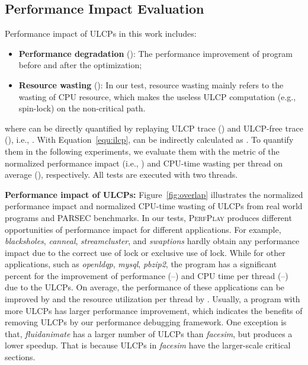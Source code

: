 \subsection{Performance Impact Evaluation}
\label{sec:perf}
Performance impact of ULCPs in this work includes:
\begin{itemize}
  \item \textbf{Performance degradation} (): The performance improvement of program before and after the optimization;
  \item \textbf{Resource wasting} (): In our test, resource wasting mainly refers to the wasting of CPU resource, which makes the useless ULCP computation (e.g., spin-lock) on the non-critical path.
\end{itemize}
\noindent where  can be directly quantified by replaying ULCP trace () and ULCP-free trace (), i.e., . With Equation~\ref{equ:ilcp},  can be indirectly calculated as . To quantify them in the following experiments, we evaluate them with the metric of the normalized performance impact (i.e., ) and CPU-time wasting per thread on average (), respectively.
All tests are executed with two threads. 

\textbf{Performance impact of ULCPs:} Figure~\ref{fig:overlap} illustrates the normalized performance impact and normalized CPU-time wasting of ULCPs from  real world programs and PARSEC benchmarks. In our tests, \textsc{PerfPlay} produces different opportunities of performance impact for different applications. For example, \emph{blacksholes}, \emph{canneal}, \emph{streamcluster}, and \emph{swaptions} hardly obtain any performance impact due to the correct use of lock or exclusive use of lock. While for other applications, such as \emph{openldqp}, \emph{mysql}, \emph{pbzip2}, the program has a significant percent for the improvement of performance (--) and CPU time per thread (--) due to the ULCPs. On average, the performance of these applications can be improved by  and the resource utilization per thread by . Usually, a program with more ULCPs has larger performance improvement, which indicates the benefits of removing ULCPs by our performance debugging framework. One exception is that, \emph{fluidanimate} has a larger number of ULCPs than \emph{facesim}, but produces a lower speedup. That is because ULCPs in \emph{facesim} have the larger-scale critical sections.

